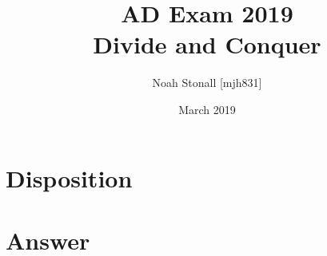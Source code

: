 \documentclass{article}
\title{AD Exam 2019 \\ Divide and Conquer}
\author{Noah Stonall [mjh831]}
\date{March 2019}
\begin{document}
\maketitle

\section*{Disposition}


\section*{Answer}

\end{document}
